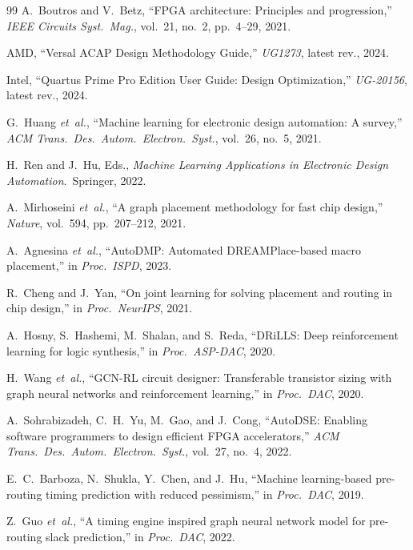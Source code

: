 \documentclass[journal]{IEEEtran}
\begin{document}
\begin{thebibliography}{99}
\footnotesize
{}
A.~Boutros and V.~Betz, ``FPGA architecture: Principles and progression,'' \emph{IEEE Circuits Syst.\ Mag.}, vol.~21, no.~2, pp.~4--29, 2021.

AMD, ``Versal ACAP Design Methodology Guide,'' \emph{UG1273}, latest rev., 2024.

Intel, ``Quartus Prime Pro Edition User Guide: Design Optimization,'' \emph{UG-20156}, latest rev., 2024.

G.~Huang \emph{et~al.}, ``Machine learning for electronic design automation: A survey,'' \emph{ACM Trans.\ Des.\ Autom.\ Electron.\ Syst.}, vol.~26, no.~5, 2021.

H.~Ren and J.~Hu, Eds., \emph{Machine Learning Applications in Electronic Design Automation}.\ Springer, 2022.

A.~Mirhoseini \emph{et~al.}, ``A graph placement methodology for fast chip design,'' \emph{Nature}, vol.~594, pp.~207--212, 2021.

A.~Agnesina \emph{et~al.}, ``AutoDMP: Automated DREAMPlace-based macro placement,'' in \emph{Proc.\ ISPD}, 2023.

R.~Cheng and J.~Yan, ``On joint learning for solving placement and routing in chip design,'' in \emph{Proc.\ NeurIPS}, 2021.

A.~Hosny, S.~Hashemi, M.~Shalan, and S.~Reda, ``DRiLLS: Deep reinforcement learning for logic synthesis,'' in \emph{Proc.\ ASP-DAC}, 2020.

H.~Wang \emph{et~al.}, ``GCN-RL circuit designer: Transferable transistor sizing with graph neural networks and reinforcement learning,'' in \emph{Proc.\ DAC}, 2020.

A.~Sohrabizadeh, C.~H.~Yu, M.~Gao, and J.~Cong, ``AutoDSE: Enabling software programmers to design efficient FPGA accelerators,'' \emph{ACM Trans.\ Des.\ Autom.\ Electron.\ Syst.}, vol.~27, no.~4, 2022.

E.~C.~Barboza, N.~Shukla, Y.~Chen, and J.~Hu, ``Machine learning-based pre-routing timing prediction with reduced pessimism,'' in \emph{Proc.\ DAC}, 2019.

Z.~Guo \emph{et~al.}, ``A timing engine inspired graph neural network model for pre-routing slack prediction,'' in \emph{Proc.\ DAC}, 2022.


\end{thebibliography}
\end{document}
